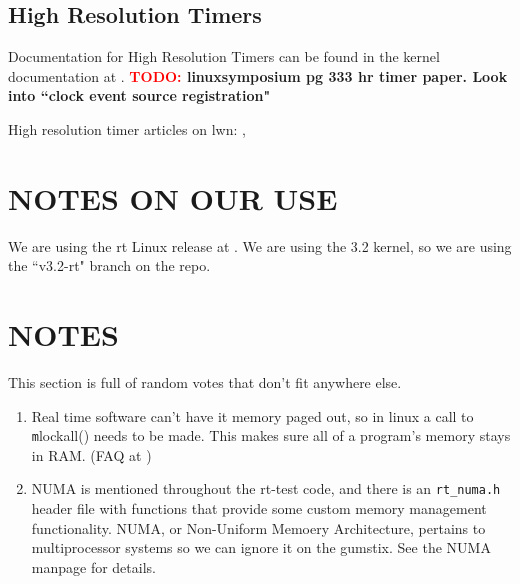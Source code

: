 \documentclass{article}
\newcommand{\TODO}[1]{ {\bf \textcolor{red}{TODO:} #1 }}
\begin{document}
\subsection{High Resolution Timers}
Documentation for High Resolution Timers can be found in the kernel documentation at \cite{highResTimerDoc}.
\TODO{linuxsymposium pg 333 hr timer paper.  Look into ``clock event source registration"}

High resolution timer articles on lwn: \cite{highResTimerAPI}, \cite{newApproachToKernelTimers}

\section{NOTES ON OUR USE}
We are using the rt Linux release at \cite{RealTimeLinuxPatch}.  We are using the 3.2 kernel, so we are using the ``v3.2-rt" branch on the repo.

\section{NOTES}
This section is full of random votes that don't fit anywhere else.
\begin{enumerate}
\item Real time software can't have it memory paged out, so in linux a call to {\texttt mlockall()} needs to be made.  This makes sure all of a program's memory stays in RAM. (FAQ at \cite{RealTimeLinux})
\item NUMA is mentioned throughout the rt-test code, and there is an \texttt{rt\_numa.h} header file with functions that provide some custom memory management functionality.  NUMA, or Non-Uniform Memoery Architecture, pertains to multiprocessor systems so we can ignore it on the gumstix.  See the NUMA manpage \cite{NUMA} for details.
\end{enumerate}

\end{document}
